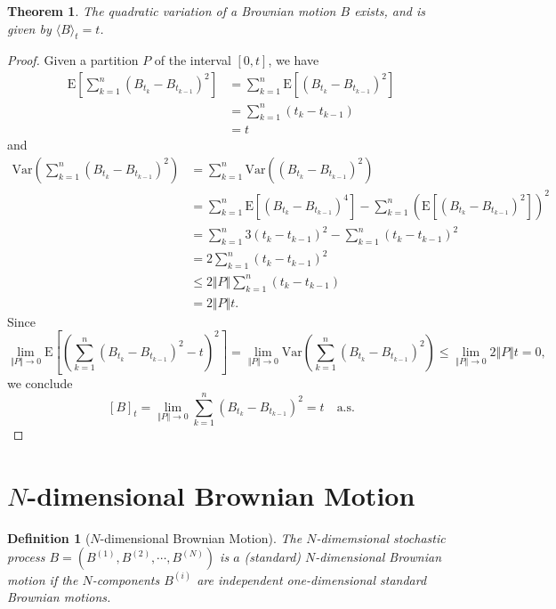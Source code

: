 \documentclass{report}
\newtheorem{definition}{Definition}[section]
\newtheorem{theorem}{Theorem}[section]
\theoremstyle{nonumberplain}
\newtheorem{proof}{Proof.}
\begin{document}
\begin{theorem}
	The quadratic variation of a Brownian motion $B$ exists, and is given by $\langle B\rangle_{t}= t$. 
\end{theorem}
\begin{proof} 
	Given a partition $P$ of the interval $[0,t]$, we have
	\[
	\begin{aligned}
	\mathrm{E}\left[\sum _{k=1}^{n}(B_{t_{k}}-B_{t_{k-1}})^{2}\right]&=\sum _{k=1}^{n}\mathrm{E}\left[(B_{t_{k}}-B_{t_{k-1}})^{2}\right]\\
	&=\sum _{k=1}^{n}(t_{k}-t_{k-1})\\
	&=t
	\end{aligned}
	\]
	and
	\[
	\begin{aligned}
	\mathrm{Var}\left(\sum _{k=1}^{n}(B_{t_{k}}-B_{t_{k-1}})^{2}\right)&=\sum _{k=1}^{n}\mathrm{Var}\left((B_{t_{k}}-B_{t_{k-1}})^{2}\right)\\
	&=\sum _{k=1}^{n}\mathrm{E}\left[(B_{t_{k}}-B_{t_{k-1}})^{4}\right]-\sum _{k=1}^{n}\left(\mathrm{E}\left[\left(B_{t_{k}}-B_{t_{k-1}}\right)^{2}\right]\right)^{2}\\
	&=\sum_{k=1}^{n}3(t_{k}-t_{k-1})^2-\sum _{k=1}^{n}\left(t_{k}-t_{k-1}\right)^{2}\\
	&=2\sum_{k=1}^{n}(t_{k}-t_{k-1})^2\\
	&\le 2\Vert P\Vert\sum_{k=1}^{n}(t_{k}-t_{k-1})\\
	&= 2\Vert P\Vert t.
	\end{aligned}
	\]
	Since
	\[
	\lim\limits_{\Vert P\Vert\to0 }\mathrm{E}\left[\left(\sum _{k=1}^{n}(B_{t_{k}}-B_{t_{k-1}})^{2}-t\right)^2\right]=\lim\limits_{\Vert P\Vert \to0}\mathrm{Var}\left(\sum _{k=1}^{n}(B_{t_{k}}-B_{t_{k-1}})^{2}\right)\le \lim\limits_{\Vert P\Vert\to0 }2\Vert P\Vert t=0,
	\]
	we conclude 
	\[
	[B]_t=\lim_{\Vert P\Vert \rightarrow 0}\sum _{k=1}^{n}(B_{t_{k}}-B_{t_{k-1}})^{2}=t\quad\text{a.s.}
	\]
\end{proof}
\section{$N$-dimensional Brownian Motion}
\begin{definition}[$N$-dimensional Brownian Motion]
	The $N$-dimemsional stochastic process $B=\left(B^{(1)}, B^{(2)}, \cdots, B^{(N)}\right)$ is
	$a$ (standard) $N$-dimensional Brownian motion if the $N$-components $B^{(i)}$ are independent one-dimensional standard Brownian motions.
\end{definition}
\end{document}
